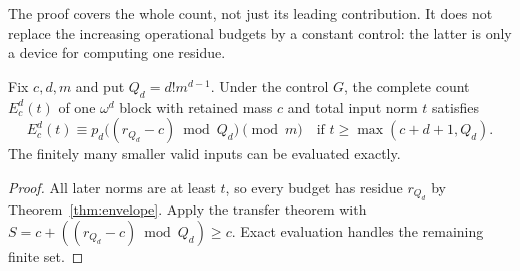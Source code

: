 The proof covers the whole count, not just its leading contribution.
It does not replace the increasing operational budgets by a constant
control: the latter is only a device for computing one residue.

\begin{corollary}
\label{cor:fixed-polynomial-residue}
Fix $c,d,m$ and put $Q_d=d!m^{d-1}$. Under the control $G$,
the complete count $E_c^d(t)$ of one $\omega^d$ block with retained
mass $c$ and total input norm $t$ satisfies
\[
 E_c^d(t)\equiv
 p_d\bigl((r_{Q_d}-c)\bmod Q_d\bigr)\pmod m
 \quad\text{if }t\ge\max(c+d+1,Q_d).
\]
The finitely many smaller valid inputs can be evaluated exactly.
\end{corollary}
\begin{proof}
All later norms are at least $t$, so every budget has residue
$r_{Q_d}$ by Theorem~\ref{thm:envelope}. Apply the transfer theorem
with $S=c+((r_{Q_d}-c)\bmod Q_d)\ge c$.
Exact evaluation handles the remaining finite set.
\end{proof}

